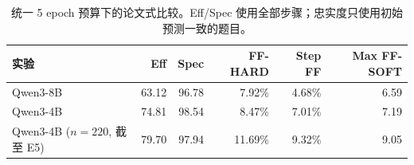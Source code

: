 \begin{table}[H]
\centering
\small
\caption{统一 5 epoch 预算下的论文式比较。Eff/Spec 使用全部步骤；忠实度只使用初始预测一致的题目。}
\label{tab:standard}
\begin{tabular}{lrrrrr}
\toprule
实验 & Eff & Spec & FF-HARD & Step FF & Max FF-SOFT \\
\midrule
Qwen3-8B & 63.12 & 96.78 & 7.92\% & 4.68\% & 6.59 \\
Qwen3-4B & 74.81 & 98.54 & 8.47\% & 7.01\% & 7.19 \\
Qwen3-4B ($n=220$, 截至 E5) & 79.70 & 97.94 & 11.69\% & 9.32\% & 9.05 \\
\bottomrule
\end{tabular}
\end{table}
